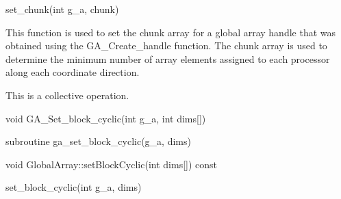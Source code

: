 \documentclass[12pt]{article}
\begin{document}
\begin{pyapi}
\begin{pycode}
set_chunk(int g_a, chunk)
\end{pycode}
\end{pyapi}
\gcoll

\begin{desc}

  This function is used to set the chunk array for a global array
  handle that was obtained using the GA_Create_handle function. The
  chunk array is used to determine the minimum number of array
  elements assigned to each processor along each coordinate direction.

  This is a collective operation.

\end{desc}


\begin{capi}
\begin{ccode}
void GA_Set_block_cyclic(int g_a, int dims[])
\end{ccode}
\begin{funcargs}
\end{funcargs}
\end{capi}

\begin{fapi}
\begin{fcode}
subroutine ga_set_block_cyclic(g_a, dims)
\end{fcode}
\begin{funcargs}
\end{funcargs}
\end{fapi}

\begin{cxxapi}
\begin{cxxcode}
void GlobalArray::setBlockCyclic(int dims[]) const
\end{cxxcode}
\begin{funcargs}
\end{funcargs}
\end{cxxapi}

\begin{pyapi}
\begin{pycode}
set_block_cyclic(int g_a, dims)
\end{pycode}
\end{pyapi}
\gcoll
\end{document}
